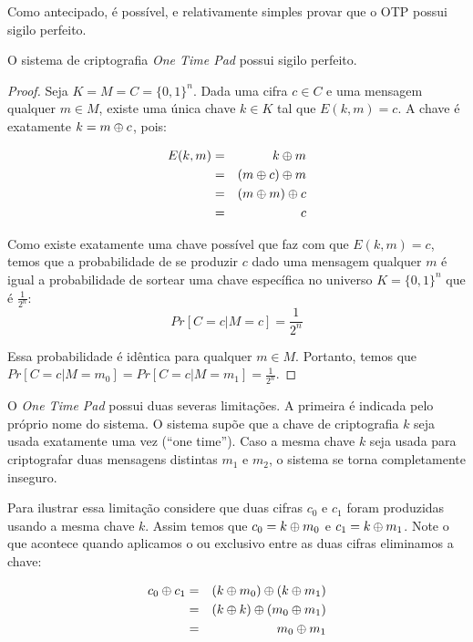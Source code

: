 Como antecipado, é possível, e relativamente simples provar que o OTP possui sigilo perfeito.

\begin{theorem}
  O sistema de criptografia {\em One Time Pad} possui sigilo perfeito.
\end{theorem}

\begin{proof}
  Seja $K = M = C = \{0,1\}^n$.
  Dada uma cifra $c \in C$ e uma mensagem qualquer $m \in M$, existe uma única chave $k \in K$ tal que $E(k,m) = c$.
  A chave é exatamente $k = m \oplus c$, pois:

  \begin{eqnarray*}
    E(k, m) & = & k \oplus m \\
            & = & (m \oplus c) \oplus m\\
            & = & (m \oplus m) \oplus c\\
            & = & c
  \end{eqnarray*}

Como existe exatamente uma chave possível que faz com que $E(k,m) = c$, temos que a probabilidade de se produzir $c$ dado uma mensagem qualquer $m$ é igual a probabilidade de sortear uma chave específica no universo $K = \{0,1\}^n$ que é $\frac{1}{2^n}$:
\begin{displaymath}
  Pr[C = c | M = c] = \frac{1}{2^n}
\end{displaymath}

Essa probabilidade é idêntica para qualquer $m \in M$.
Portanto, temos que $Pr[C = c| M = m_0] = Pr[C = c | M = m_1] = \frac{1}{2^n}$.
\end{proof}

O {\em One Time Pad} possui duas severas limitações.
A primeira é indicada pelo próprio nome do sistema.
O sistema supõe que a chave de criptografia $k$ seja usada exatamente uma vez (``one time'').
Caso a mesma chave $k$ seja usada para criptografar duas mensagens distintas $m_1$ e $m_2$, o sistema se torna completamente inseguro.

Para ilustrar essa limitação considere que duas cifras $c_0$ e $c_1$ foram produzidas usando a mesma chave $k$.
Assim temos que $c_0 = k \oplus m_0$ e $c_1 = k \oplus m_1$.
Note o que acontece quando aplicamos o ou exclusivo entre as duas cifras eliminamos a chave:


\begin{eqnarray*}
  c_0 \oplus c_1 & = & (k \oplus m_0) \oplus (k \oplus m_1)\\
              & = & (k \oplus k) \oplus (m_0 \oplus m_1)\\
              & = & m_0 \oplus m_1
\end{eqnarray*}

